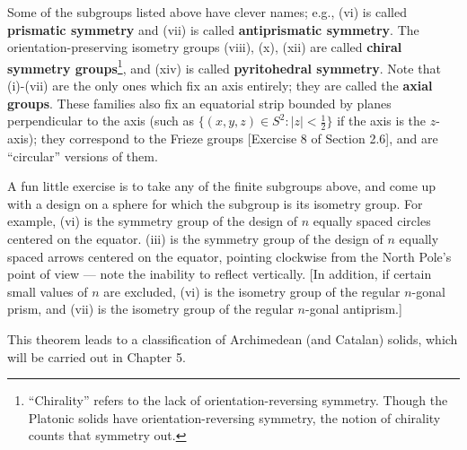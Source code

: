 \documentclass[leqno]{book}
\begin{document}
Some of the subgroups listed above have clever names; e.g., (vi) is called \textbf{prismatic symmetry} and (vii) is called \textbf{antiprismatic symmetry}.  The orientation-preserving isometry groups (viii), (x), (xii) are called \textbf{chiral symmetry groups}\footnote{``Chirality'' refers to the lack of orientation-reversing symmetry.  Though the Platonic solids have orientation-reversing symmetry, the notion of chirality counts that symmetry out.}, and (xiv) is called \textbf{pyritohedral symmetry}.  Note that (i)-(vii) are the only ones which fix an axis entirely; they are called the \textbf{axial groups}.  These families also fix an equatorial strip bounded by planes perpendicular to the axis (such as $\{(x,y,z)\in S^2:|z|<\frac 12\}$ if the axis is the $z$-axis); they correspond to the Frieze groups [Exercise 8 of Section 2.6], and are ``circular'' versions of them.

A fun little exercise is to take any of the finite subgroups above, and come up with a design on a sphere for which the subgroup is its isometry group.  For example, (vi) is the symmetry group of the design of $n$ equally spaced circles centered on the equator.  (iii) is the symmetry group of the design of $n$ equally spaced arrows centered on the equator, pointing clockwise from the North Pole's point of view \---- note the inability to reflect vertically.  [In addition, if certain small values of $n$ are excluded, (vi) is the isometry group of the regular $n$-gonal prism, and (vii) is the isometry group of the regular $n$-gonal antiprism.] %

This theorem leads to a classification of Archimedean (and Catalan) solids, which will be carried out in Chapter 5.
\end{document}
